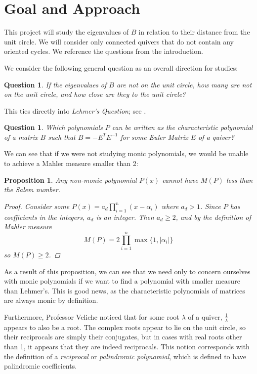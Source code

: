 \documentclass{amsart}
\theoremstyle{theorem}
\theoremstyle{theorem*}
\newtheorem{proposition}[theorem]{Proposition}
\newtheorem{question}[theorem]{Question}
\theoremstyle{definition}
\begin{document}
\section*{Goal and Approach}

This project will study the eigenvalues of $B$ in relation to their distance
from the unit circle. We will consider only connected quivers that do not
contain any oriented cycles. We reference the questions from the introduction.

We consider the following general question as an overall direction for studies:
\begin{question}
    If the eigenvalues of $B$ are not on the unit circle, how many are not on
the unit circle, and how close are they to the unit circle?
\end{question}

This ties directly into \textit{Lehmer's Question}; see \cite{m}.

\begin{question}
    Which polynomials $P$ can be written as the characteristic polynomial of a
    matrix $B$ such that $B = - E^T E^{-1}$ for some Euler Matrix $E$ of a
    quiver?
\end{question}

We can see that if we were not studying monic polynomials, we would be unable
to achieve a Mahler measure smaller than 2:

\begin{proposition}
    Any non-monic polynomial $P(x)$ cannot have $M(P)$ less than the Salem number.
    \begin{proof}
        Consider some $P(x) = a_d \prod_{i=1}^{n} (x - \alpha_i)$ where $a_d > 1$. Since $P$ has coefficients
        in the integers, $a_d$ is an integer. Then $a_d \geq 2$, and by the definition of Mahler measure
        $$M(P) = 2 \prod_{i=1}^{n} \max\{1, |\alpha_i|\}$$ so $M(P) \geq 2$.
    \end{proof}
\end{proposition}

As a result of this proposition, we can see that we need only to concern ourselves with monic polynomials if we
want to find a polynomial with smaller measure than Lehmer's. This is good news, as the characteristic polynomials
of matrices are always monic by definition. 

Furthermore, Professor Veliche noticed that for some root $\lambda$ of a quiver,
$\frac{1}{\lambda}$ appears to also be a root. The complex roots appear to lie on
the unit circle, so their reciprocals are simply their conjugates, but in cases with
real roots other than 1, it appears that they are indeed reciprocals. This notion
corresponds with the definition of a \textit{reciprocal} or \textit{palindromic polynomial}, 
which is defined to have palindromic coefficients. 
\end{document}
